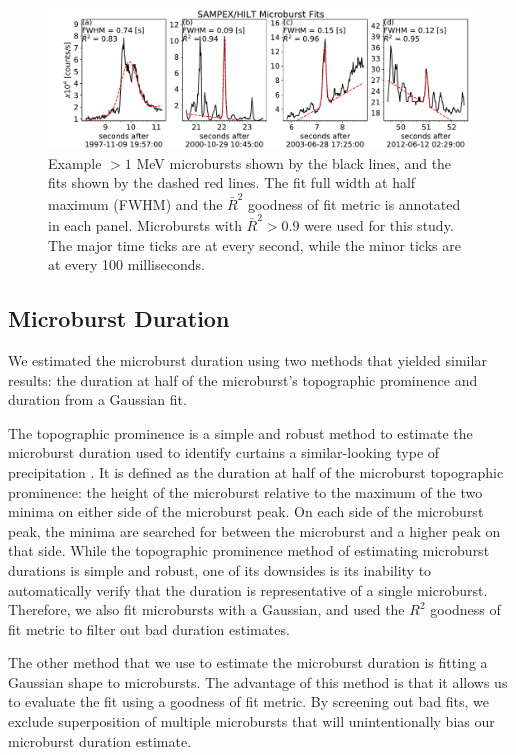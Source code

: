 \documentclass[draft]{agujournal2019}
\begin{document}
\begin{figure}
\noindent\includegraphics[width=\textwidth]{figures/fig1.pdf}
\caption{Example $>1$ MeV microbursts shown by the black lines, and the fits shown by the dashed red lines. The fit full width at half maximum (FWHM) and the $\bar{R}^2$ goodness of fit metric is annotated in each panel. Microbursts with $\bar{R}^2 > 0.9$ were used for this study. The major time ticks are at every second, while the minor ticks are at every 100 milliseconds.}
\label{fig1}
\end{figure}

\subsection{Microburst Duration}
We estimated the microburst duration using two methods that yielded similar results: the duration at half of the microburst's topographic prominence and duration from a Gaussian fit.

The topographic prominence is a simple and robust method to estimate the microburst duration used to identify curtains a similar-looking type of precipitation \cite{Shumko2020b}. It is defined as the duration at half of the microburst topographic prominence: the height of the microburst relative to the maximum of the two minima on either side of the microburst peak. On each side of the microburst peak, the minima are searched for between the microburst and a higher peak on that side. While the topographic prominence method of estimating microburst durations is simple and robust, one of its downsides is its inability to automatically verify that the duration is representative of a single microburst. Therefore, we also fit microbursts with a Gaussian, and used the $R^2$ goodness of fit metric to filter out bad duration estimates.

The other method that we use to estimate the microburst duration is fitting a Gaussian shape to microbursts. The advantage of this method is that it allows us to evaluate the fit using a goodness of fit metric. By screening out bad fits, we exclude superposition of multiple microbursts that will unintentionally bias our microburst duration estimate.
\end{document}
